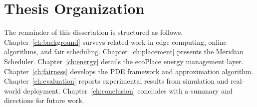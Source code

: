\section{Thesis Organization}

The remainder of this dissertation is structured as follows.
Chapter~\ref{ch:background} surveys related work in edge computing, online
algorithms, and fair scheduling. Chapter~\ref{ch:placement} presents the
Meridian Scheduler. Chapter~\ref{ch:energy} details the ecoPlace energy
management layer. Chapter~\ref{ch:fairness} develops the PDE framework and
approximation algorithm. Chapter~\ref{ch:evaluation} reports experimental
results from simulation and real-world deployment. Chapter~\ref{ch:conclusion}
concludes with a summary and directions for future work.

